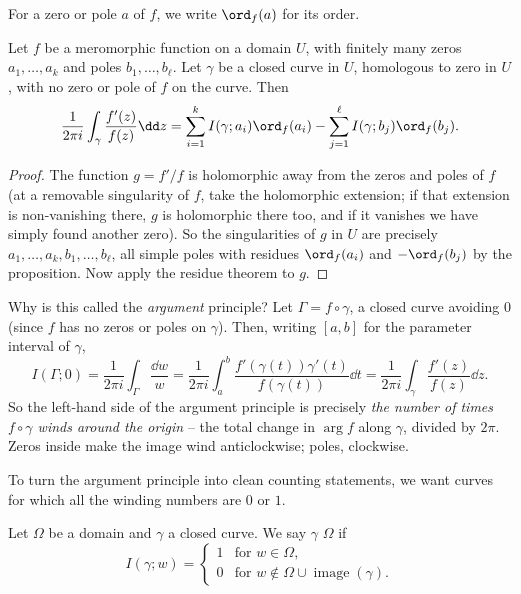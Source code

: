 \begin{definition}
    For a zero or pole $a$ of $f$, we write $\ord_f(a)$ for its order.
\end{definition}

\begin{theorem}
    Let $f$ be a meromorphic function on a domain $U$, with finitely many zeros $a_1, \dots, a_k$ and poles $b_1, \dots, b_\ell$. Let $\gamma$ be a closed curve in $U$, homologous to zero in $U$, with no zero or pole of $f$ on the curve. Then
    $$
    \frac{1}{2 \pi i} \int_\gamma \frac{f'(z)}{f(z)} \dd z = \sum_{i = 1}^{k} I(\gamma; a_i) \ord_f(a_i) - \sum_{j = 1}^{\ell} I(\gamma; b_j) \ord_f(b_j).
    $$
\end{theorem}
\begin{proof}
    The function $g = f'/f$ is holomorphic away from the zeros and poles of $f$ (at a removable singularity of $f$, take the holomorphic extension; if that extension is non-vanishing there, $g$ is holomorphic there too, and if it vanishes we have simply found another zero). So the singularities of $g$ in $U$ are precisely $a_1, \dots, a_k, b_1, \dots, b_\ell$, all simple poles with residues $\ord_f(a_i)$ and $-\ord_f(b_j)$ by the proposition. Now apply the residue theorem to $g$.
\end{proof}

Why is this called the \emph{argument} principle? Let $\Gamma = f \circ \gamma$, a closed curve avoiding $0$ (since $f$ has no zeros or poles on $\gamma$). Then, writing $[a, b]$ for the parameter interval of $\gamma$,
$$
I(\Gamma; 0) = \frac{1}{2 \pi i}\int_\Gamma \frac{\dd w}{w} = \frac{1}{2 \pi i} \int_a^b \frac{f'(\gamma(t)) \gamma'(t)}{f(\gamma(t))} \dd t = \frac{1}{2 \pi i}\int_\gamma \frac{f'(z)}{f(z)} \dd z.
$$
So the left-hand side of the argument principle is precisely \emph{the number of times $f \circ \gamma$ winds around the origin} -- the total change in $\arg f$ along $\gamma$, divided by $2\pi$. Zeros inside make the image wind anticlockwise; poles, clockwise.

To turn the argument principle into clean counting statements, we want curves for which all the winding numbers are $0$ or $1$.

\begin{definition}
    Let $\Omega$ be a domain and $\gamma$ a closed curve. We say $\gamma$  $\Omega$ if
    $$
    I(\gamma; w) = \begin{cases}
        1 &\mbox{for } w \in \Omega, \\
        0 &\mbox{for } w \notin \Omega \cup \operatorname{image}(\gamma).
       \end{cases}
    $$
\end{definition}


